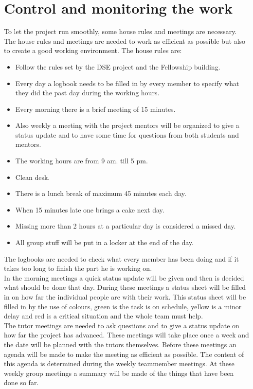 \documentclass[a4paper]{report}
\begin{document}
\section{Control and monitoring the work}
To let the project run smoothly, some house rules and meetings are necessary. The house rules and meetings are needed to work as efficient as possible but also to create a good working environment. The house rules are:\\
\begin{itemize}
\item Follow the rules set by the DSE project and the Fellowship building.
\item Every day a logbook needs to be filled in by every member to specify what they did the past day during the working hours.
\item Every morning there is a brief meeting of 15 minutes.
\item Also weekly a meeting with the project mentors will be organized to give a status update and to have some time for questions from both students and mentors.
\item The working hours are from 9 am. till 5 pm.
\item Clean desk.
\item There is a lunch break of maximum 45 minutes each day.
\item When 15 minutes late one brings a cake next day.
\item Missing more than 2 hours at a particular day is considered a missed day.
\item All group stuff will be put in a locker at the end of the day.
\end{itemize}
The logbooks are needed to check what every member has been doing and if it takes too long to finish the part he is working on.\\
In the morning meetings a quick status update will be given and then is decided what should be done that day. During these meetings a status sheet will be filled in on how far the individual people are with their work. This status sheet will be filled in by the use of colours, green is the task is on schedule, yellow is a minor delay and red is a critical situation and the whole team must help. \\
The tutor meetings are needed to ask questions and to give a status update on how far the project has advanced. These meetings will take place once a week and the date will be planned with the tutors themselves. Before these meetings an agenda will be made to make the meeting as efficient as possible. The content of this agenda is determined during the weekly teammember meetings. At these weekly group meetings a summary will be made of the things that have been done so far.\\
\end{document}
